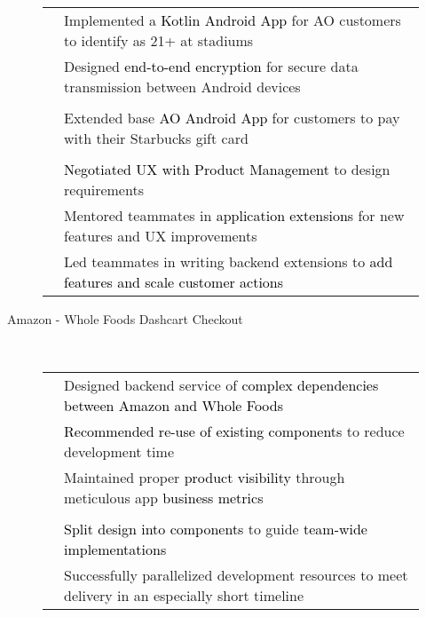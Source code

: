 \documentclass[11pt]{article}
\begin{document}
\begin{description}
\begin{description}
\begin{tabularx}{\linewidth}{>{\centering\arraybackslash}l|X}
                        & Implemented a \textcolor{black}{Kotlin Android App} for AO customers to identify as 21+ at stadiums\\
                        & Designed \textcolor{black}{end-to-end encryption} for secure data transmission between Android devices\\
                        \\
                        \multirow{1}{*}{\textcolor{black}{Starbucks}}
                        & Extended base \textcolor{black}{AO Android App} for customers to pay with their Starbucks gift card\\
                        \\
                        \multirow{3}{*}{\textcolor{black}{Leadership}}
                        & \textcolor{black}{Negotiated UX with Product Management} to design requirements \\
                        & Mentored teammates in \textcolor{black}{application extensions} for new features and UX improvements\\
                        & Led teammates in writing backend extensions to \textcolor{black}{add features and scale customer actions}\\
                    \end{tabularx}

                \item[Amazon - Whole Foods Dashcart Checkout] \hfill \\
                \textcolor{gray}{
                    \begin{tabularx}{\linewidth}{>{\centering\arraybackslash}l|X}
                        \multirow{3}{*}{\textcolor{black}{Backend}}
                            & Designed backend service of \textcolor{black}{complex dependencies between Amazon and Whole Foods} \\
                            & \textcolor{black}{Recommended re-use of existing components} to reduce development time \\
                            & Maintained proper \textcolor{black}{product visibility} through meticulous app \textcolor{black}{business metrics} \\
                        \\
                        \multirow{2}{*}{\textcolor{black}{Leadership}}
                            & \textcolor{black}{Split design into components} to guide \textcolor{black}{team-wide implementations}\\
                            & Successfully parallelized development resources to meet delivery in an especially short timeline\\
                    \end{tabularx}
                }


\end{description}
\end{description}
\end{document}
